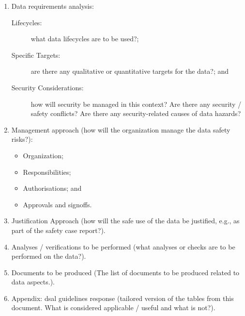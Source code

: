\begin{enumerate}
  \item Data requirements analysis:
  \begin{description}
    \item[Lifecycles:] what data lifecycles are to be used?;
    \item[Specific Targets:] are there any qualitative or quantitative targets for the data?; and
    \item[Security Considerations:] how will security be managed in this context? Are there any security / safety conflicts? Are there any security-related causes of data \glspl{hazard}?
  \end{description}
  \item Management approach (how will the organization manage the data safety risks?):
  \begin{itemize}
    \item Organization;
    \item Responsibilities;
    \item Authorisations; and
    \item Approvals and signoffs.
  \end{itemize}
  \item Justification Approach (how will the safe use of the data be justified, e.g., as part of the safety case report?). 
  \item Analyses / \glspl{verification} to be performed (what analyses or checks are to be performed on the data?).
  \item Documents to be produced (The list of documents to be produced related to data aspects.).
  \item Appendix: \gls{dsal} guidelines response (tailored version of the tables from this document. What is considered applicable / useful and what is not?).
\end{enumerate}
